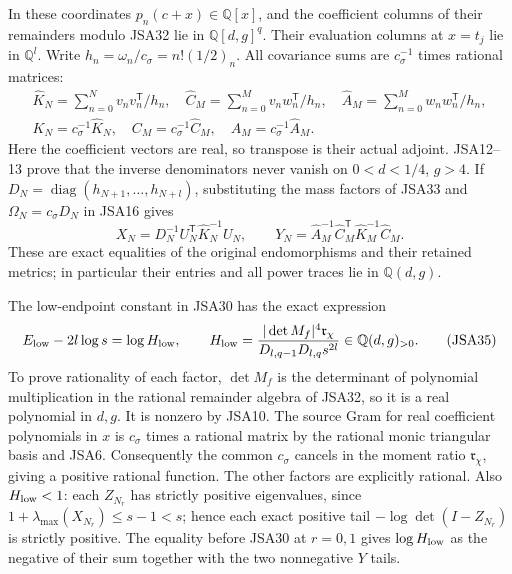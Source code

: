 \documentclass[11pt,a4paper]{article}
\newcommand{\diag}{\operatorname{diag}}
\begin{document}
In these coordinates $p_n(c+x)\in\mathbb Q[x]$, and the
coefficient columns of their remainders modulo JSA32 lie in
$\mathbb Q[d,g]^q$. Their evaluation columns at $x=t_j$ lie
in $\mathbb Q^l$. Write $h_n=\omega_n/c_\sigma=n!(1/2)_n$.
All covariance sums are $c_\sigma^{-1}$ times rational matrices:
\[
\begin{gathered}
 \widehat K_N=\sum_{n=0}^N v_nv_n^{\mathsf T}/h_n,
 \quad\widehat C_M=\sum_{n=0}^M v_nw_n^{\mathsf T}/h_n,
 \quad\widehat A_M=\sum_{n=0}^M w_nw_n^{\mathsf T}/h_n,\\
 K_N=c_\sigma^{-1}\widehat K_N,\quad
 C_M=c_\sigma^{-1}\widehat C_M,\quad
 A_M=c_\sigma^{-1}\widehat A_M.
\end{gathered}\tag{JSA33}
\]
Here the coefficient vectors are real, so transpose is their
actual adjoint. JSA12--13 prove that the inverse denominators
never vanish on $0<d<1/4$, $g>4$. If
$D_N=\diag(h_{N+1},\ldots,h_{N+l})$, substituting the mass
factors of JSA33 and $\Omega_N=c_\sigma D_N$ in JSA16 gives
\[
 X_N=D_N^{-1}U_N^{\mathsf T}\widehat K_N^{-1}U_N,\qquad
 Y_N=\widehat A_M^{-1}\widehat C_M^{\mathsf T}
                    \widehat K_M^{-1}\widehat C_M.
\tag{JSA34}
\]
These are exact equalities of the original endomorphisms and
their retained metrics; in particular their entries and all
power traces lie in $\mathbb Q(d,g)$.

The low-endpoint constant in JSA30 has the exact expression
\[
 E_{\rm low}-2l\log s=\log H_{\rm low},\qquad
 H_{\rm low}=
 \frac{|\det M_f|^4\mathfrak r_\chi}
      {D_{l,q-1}D_{l,q}s^{2l}}\in\mathbb Q(d,g)_{>0}.
\tag{JSA35}
\]
To prove rationality of each factor, $\det M_f$ is the
determinant of polynomial multiplication in the rational
remainder algebra of JSA32, so it is a real polynomial in
$d,g$. It is nonzero by JSA10. The source Gram for real
coefficient polynomials in $x$ is $c_\sigma$ times a rational
matrix by the rational monic triangular basis and JSA6.
Consequently the common $c_\sigma$ cancels in the moment ratio
$\mathfrak r_\chi$, giving a positive rational function.
The other factors are explicitly rational. Also $H_{\rm low}<1$:
each $Z_{N_r}$ has strictly positive eigenvalues, since
$1+\lambda_{\max}(X_{N_r})\leq s-1<s$; hence each exact
positive tail $-\log\det(I-Z_{N_r})$ is strictly positive.
The equality before JSA30 at $r=0,1$ gives
$\log H_{\rm low}$ as the negative of their sum together
with the two nonnegative $Y$ tails.
\end{document}
